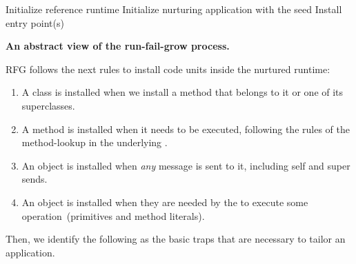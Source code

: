 \begin{algorithm}[ht]
 Initialize reference runtime\;
 Initialize nurturing application with the seed\;
 Install entry point(s)\;
 \caption{\textbf{An abstract view of the run-fail-grow process.}\label{alg:tailoring_process}}
\end{algorithm}

RFG follows the next rules to install code units inside the nurtured runtime:

\begin{enumerate}
\item A class is installed when we install a method that belongs to it or one of its superclasses.
\item A method is installed when it needs to be executed, following the rules of the method-lookup in the underlying \VM.
\item An object is installed when \emph{any} message is sent to it, including self and super sends.
\item An object is installed when they are needed by the \VM to execute some operation~(\eg primitives and method literals).
\end{enumerate}

Then, we identify the following as the basic traps that are necessary to tailor an application.

